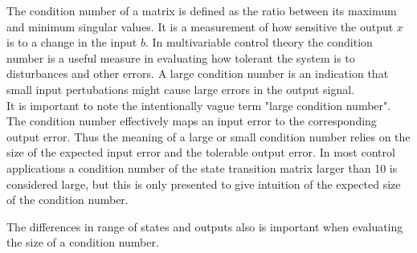 The condition number of a matrix is defined as the ratio between its maximum and minimum singular values. It is a measurement of how sensitive the output $x$ is to a change in the input $b$. In multivariable control theory the condition number is a useful measure in evaluating how tolerant the system is to disturbances and other errors. A large condition number is an indication that small input pertubations might cause large errors in the output signal.\\

It is important to note the intentionally vague term "large condition number". The condition number effectively maps an input error to the corresponding output error. Thus the meaning of a large or small condition number relies on the size of the expected input error and the tolerable output error. In most control applications a condition number of the state transition matrix larger than 10 is considered large, but this is only presented to give intuition of the expected size of the condition number.

The differences in range of states and outputs also is important when evaluating the size of a condition number.
